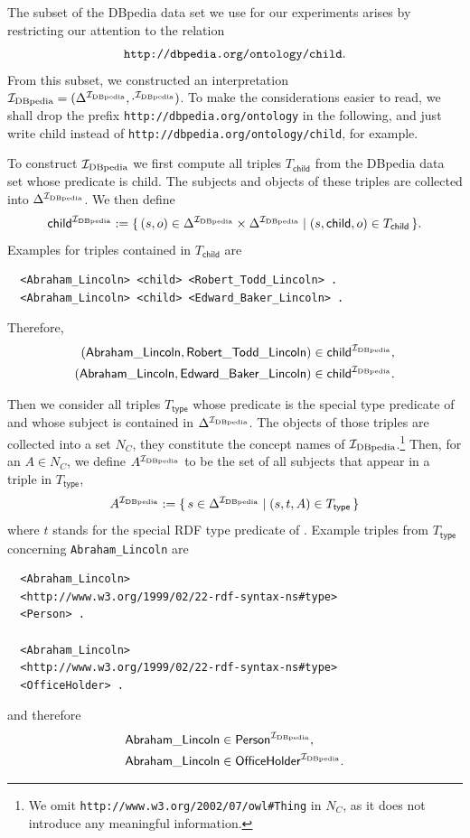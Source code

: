 The subset of the DBpedia data set we use for our experiments arises by restricting our
attention to the relation
\begin{equation*}
  \verb|http://dbpedia.org/ontology/child|.
\end{equation*}
From this subset, we constructed an interpretation ${\mathcal{I}_{\text{DBpedia}}} = (\Delta^{{\mathcal{I}_{\text{DBpedia}}}},
\cdot^{{\mathcal{I}_{\text{DBpedia}}}})$.  To make the considerations easier to read, we shall drop the prefix
\verb|http://dbpedia.org/ontology| in the following, and just write \textsf{child} instead
of \texttt{http://dbpedia.org/ontology/child}, for example.

To construct ${\mathcal{I}_{\text{DBpedia}}}$ we first compute all triples $T_{\mathsf{child}}$ from the
DBpedia data set whose predicate is \textsf{child}.  The subjects and objects of these
triples are collected into $\Delta^{{\mathcal{I}_{\text{DBpedia}}}}$.  We then define
\begin{equation*}
  \mathsf{child}^{{\mathcal{I}_{\text{DBpedia}}}} := {\{\, (s, o) \in \Delta^{\mathcal{I}_{\text{DBpedia}}} \times \Delta^{\mathcal{I}_{\text{DBpedia}}}
    \mid (s, \mathsf{child}, o) \in T_{\mathsf{child}} \,\}}.
\end{equation*}
Examples for triples contained in $T_{\mathsf{child}}$ are
\begin{verbatim}
  <Abraham_Lincoln> <child> <Robert_Todd_Lincoln> .
  <Abraham_Lincoln> <child> <Edward_Baker_Lincoln> .
\end{verbatim}
Therefore,
\begin{align*}
  (\mathsf{Abraham\_Lincoln}, \mathsf{Robert\_Todd\_Lincoln}) &\in \mathsf{child}^{{\mathcal{I}_{\text{DBpedia}}}},\\
  (\mathsf{Abraham\_Lincoln}, \mathsf{Edward\_Baker\_Lincoln}) &\in \mathsf{child}^{{\mathcal{I}_{\text{DBpedia}}}}.
\end{align*}

Then we consider all triples $T_{\mathsf{type}}$ whose predicate is the special type
predicate of  and whose subject is contained in $\Delta^{{\mathcal{I}_{\text{DBpedia}}}}$.  The
objects of those triples are collected into a set $N_C$, \ie they constitute the concept
names of ${\mathcal{I}_{\text{DBpedia}}}$.\footnote{We omit \texttt{http://www.w3.org/2002/07/owl\#Thing} in
  $N_C$, as it does not introduce any meaningful information.} Then, for an $A \in N_C$,
we define $A^{{\mathcal{I}_{\text{DBpedia}}}}$ to be the set of all subjects that appear in a triple in
$T_{\mathsf{type}}$, \ie
\begin{equation*}
  A^{{\mathcal{I}_{\text{DBpedia}}}} := {\{\, s \in \Delta^{{\mathcal{I}_{\text{DBpedia}}}} \mid (s, t, A) \in
    T_{\mathsf{type}} \,\}}
\end{equation*}
where $t$ stands for the special RDF type predicate of .  Example triples from
$T_{\mathsf{type}}$ concerning \verb|Abraham_Lincoln| are
\begin{verbatim}
  <Abraham_Lincoln>
  <http://www.w3.org/1999/02/22-rdf-syntax-ns#type>
  <Person> .

  <Abraham_Lincoln>
  <http://www.w3.org/1999/02/22-rdf-syntax-ns#type>
  <OfficeHolder> .
\end{verbatim}
and therefore
\begin{align*}
  \mathsf{Abraham\_Lincoln} &\in \mathsf{Person}^{{\mathcal{I}_{\text{DBpedia}}}}, \\
  \mathsf{Abraham\_Lincoln} &\in \mathsf{OfficeHolder}^{{\mathcal{I}_{\text{DBpedia}}}}.
\end{align*}

